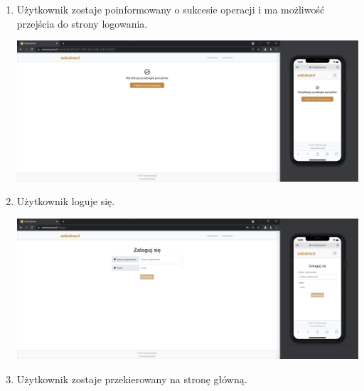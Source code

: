 \documentclass{article}
\begin{document}
\begin{itemize}
\begin{enumerate}
\begin{center}
            \end{center}
            \item Użytkownik zostaje poinformowany o sukcesie operacji i ma możliwość przejścia do strony logowania.
            \begin{center}
                    \centering  \includegraphics[width=15.5cm]{Weryfikacja.png}
            \end{center}
            \item Użytkownik loguje się.
            \begin{center}
                    \centering  \includegraphics[width=15.5cm]{StronaLogowania.png}
            \end{center}
            \item Użytkownik zostaje przekierowany na stronę główną.
        \end{enumerate}
        

\end{itemize}
\end{document}
